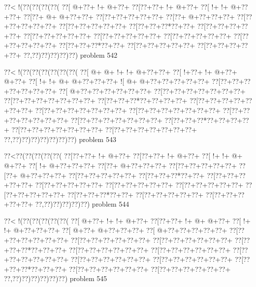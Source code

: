 \vbox{\vbox{\goo
\0??<\- !(\0??(\0??(\0??(\0??(
\0??[\- @+\0??+\- !+\- @+\0??+
\0??[\0??+\0??+\- !+\- @+\0??+
\0??[\- !+\- !+\- @+\0??+\0??+
\0??[\0??+\- @+\- @+\0??+\0??+
\0??[\0??+\0??+\0??+\0??+\0??+
\0??[\0??+\- @+\0??+\0??+\0??+
\0??[\0??+\0??+\0??+\0??+\0??+
\0??[\0??+\0??+\0??+\0??+\0??+
\0??[\0??+\0??+\0??*\0??+\0??+
\0??[\0??+\0??+\0??+\0??+\0??+
\0??[\0??+\0??+\0??+\0??+\0??+
\0??[\0??+\0??+\0??+\0??+\0??+
\0??[\0??+\0??+\0??+\0??+\0??+
\0??[\0??+\0??+\0??+\0??+\0??+
\0??[\0??+\0??+\0??*\0??+\0??+
\0??[\0??+\0??+\0??+\0??+\0??+
\0??[\0??+\0??+\0??+\0??+\0??+
\0??,\0??)\0??)\0??)\0??)\0??)
}
\hfil problem 542\hfil\break
}

\vbox{\vbox{\goo
\0??<\- !(\0??(\0??(\0??(\0??(\0??(\0??(
\0??[\- @+\- @+\- !+\- !+\- @+\0??+\0??+
\0??[\- !+\0??+\- !+\- @+\0??+\- @+\0??+
\0??[\- !+\- !+\- @+\- @+\0??+\0??+\0??+
\- ![\- @+\- @+\0??+\0??+\0??+\0??+\0??+
\0??[\0??+\0??+\0??+\0??+\0??+\0??+\0??+
\0??[\- @+\0??+\0??+\0??+\0??+\0??+\0??+
\0??[\0??+\0??+\0??+\0??+\0??+\0??+\0??+
\0??[\0??+\0??+\0??+\0??+\0??+\0??+\0??+
\0??[\0??+\0??+\0??*\0??+\0??+\0??+\0??+
\0??[\0??+\0??+\0??+\0??+\0??+\0??+\0??+
\0??[\0??+\0??+\0??+\0??+\0??+\0??+\0??+
\0??[\0??+\0??+\0??+\0??+\0??+\0??+\0??+
\0??[\0??+\0??+\0??+\0??+\0??+\0??+\0??+
\0??[\0??+\0??+\0??+\0??+\0??+\0??+\0??+
\0??[\0??+\0??+\0??*\0??+\0??+\0??+\0??+
\0??[\0??+\0??+\0??+\0??+\0??+\0??+\0??+
\0??[\0??+\0??+\0??+\0??+\0??+\0??+\0??+
\0??,\0??)\0??)\0??)\0??)\0??)\0??)\0??)
}
\hfil problem 543\hfil\break
}

\vbox{\vbox{\goo
\0??<\0??(\0??(\0??(\0??(\0??(
\0??[\0??+\0??+\- !+\- @+\0??+
\0??[\0??+\0??+\- !+\- @+\0??+
\0??[\- !+\- !+\- @+\- @+\0??+
\0??[\- !+\- @+\0??+\0??+\0??+
\0??[\0??+\- @+\0??+\0??+\0??+
\0??[\0??+\0??+\0??+\0??+\0??+
\0??[\0??+\- @+\0??+\0??+\0??+
\0??[\0??+\0??+\0??+\0??+\0??+
\0??[\0??+\0??+\0??*\0??+\0??+
\0??[\0??+\0??+\0??+\0??+\0??+
\0??[\0??+\0??+\0??+\0??+\0??+
\0??[\0??+\0??+\0??+\0??+\0??+
\0??[\0??+\0??+\0??+\0??+\0??+
\0??[\0??+\0??+\0??+\0??+\0??+
\0??[\0??+\0??+\0??*\0??+\0??+
\0??[\0??+\0??+\0??+\0??+\0??+
\0??[\0??+\0??+\0??+\0??+\0??+
\0??,\0??)\0??)\0??)\0??)\0??)
}
\hfil problem 544\hfil\break
}

\vbox{\vbox{\goo
\0??<\- !(\0??(\0??(\0??(\0??(\0??(
\0??[\- @+\0??+\- !+\- !+\- @+\0??+
\0??[\0??+\0??+\- !+\- @+\- @+\0??+
\0??[\- !+\- !+\- @+\0??+\0??+\0??+
\0??[\- @+\0??+\- @+\0??+\0??+\0??+
\0??[\- @+\0??+\0??+\0??+\0??+\0??+
\0??[\0??+\0??+\0??+\0??+\0??+\0??+
\0??[\0??+\0??+\0??+\0??+\0??+\0??+
\0??[\0??+\0??+\0??+\0??+\0??+\0??+
\0??[\0??+\0??+\0??*\0??+\0??+\0??+
\0??[\0??+\0??+\0??+\0??+\0??+\0??+
\0??[\0??+\0??+\0??+\0??+\0??+\0??+
\0??[\0??+\0??+\0??+\0??+\0??+\0??+
\0??[\0??+\0??+\0??+\0??+\0??+\0??+
\0??[\0??+\0??+\0??+\0??+\0??+\0??+
\0??[\0??+\0??+\0??*\0??+\0??+\0??+
\0??[\0??+\0??+\0??+\0??+\0??+\0??+
\0??[\0??+\0??+\0??+\0??+\0??+\0??+
\0??,\0??)\0??)\0??)\0??)\0??)\0??)
}
\hfil problem 545\hfil\break
}

